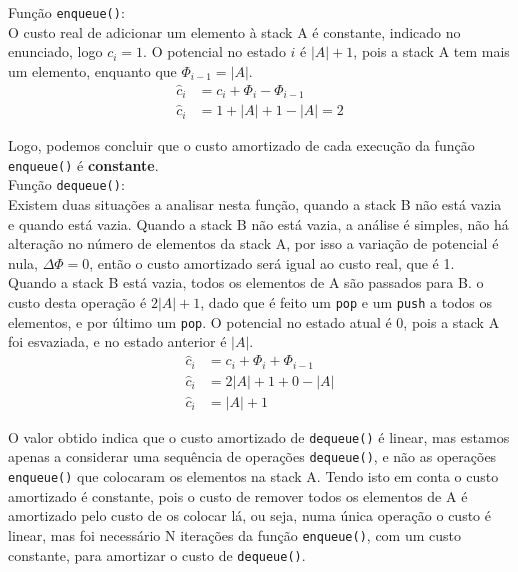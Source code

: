 \documentclass[a4paper,11pt]{article}
\begin{document}
	\noindent Função \texttt{enqueue()}:\\
	
	\noindent O custo real de adicionar um elemento à stack A é constante, indicado no enunciado, logo $c_i = 1$. O potencial no estado $i$ é $|A|+1$, pois a stack A tem mais um elemento, enquanto que $\Phi_{i-1} = |A|$.
	\begin{align*}
		\hat{c}_i & = c_i + \Phi_i - \Phi_{i-1} \\
		\hat{c}_i & = 1 + |A| + 1 - |A| = 2
	\end{align*}
	
	\noindent Logo, podemos concluir que o custo amortizado de cada execução da função \texttt{enqueue()} é \textbf{constante}.\\
	
	\noindent Função \texttt{dequeue()}:\\
	
	\noindent Existem duas situações a analisar nesta função, quando a stack B não está vazia e quando está vazia. Quando a stack B não está vazia, a análise é simples, não há alteração no número de elementos da stack A, por isso a variação de potencial é nula, $\Delta \Phi = 0$, então o custo amortizado será igual ao custo real, que é 1.\\
	
	\noindent Quando a stack B está vazia, todos os elementos de A são passados para B. o custo desta operação é $ 2 |A| + 1 $, dado que é feito um \texttt{pop} e um \texttt{push} a todos os elementos, e por último um \texttt{pop}. O potencial no estado atual é 0, pois a stack A foi esvaziada, e no estado anterior é $|A|$.
	\begin{align*}
		\hat{c}_i & = c_i + \Phi_i + \Phi_{i-1} \\
		\hat{c}_i & = 2 |A| + 1 + 0 - |A| \\
		\hat{c}_i & = |A| + 1
	\end{align*}
		
	\noindent O valor obtido indica que o custo amortizado de \texttt{dequeue()} é linear, mas estamos apenas a considerar uma sequência de operações \texttt{dequeue()}, e não as operações \texttt{enqueue()} que colocaram os elementos na stack A. Tendo isto em conta o custo amortizado é constante, pois o custo de remover todos os elementos de A é amortizado pelo custo de os colocar lá, ou seja, numa única operação o custo é linear, mas foi necessário N iterações da função \texttt{enqueue()}, com um custo constante, para amortizar o custo de \texttt{dequeue()}.\\
	
\end{document}
